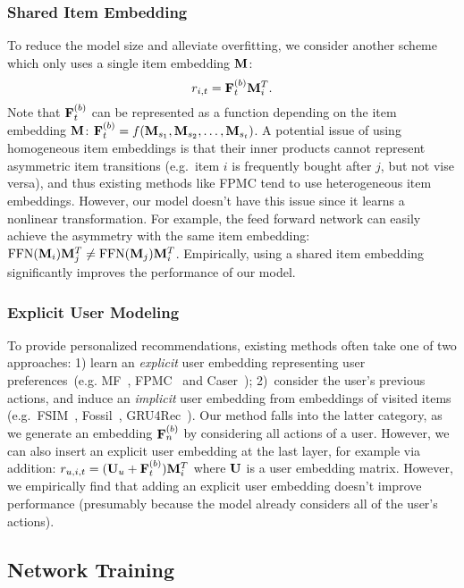 \documentclass[conference]{IEEEtran}
\def\F{{\bf F}}
\def\M{{\bf M}}
\def\U{{\bf U}}
\newcommand{\xhdr}[1]{\subsubsection*{\bf #1}}
\begin{document}
\xhdr{Shared Item Embedding} To reduce the model size and alleviate overfitting, we consider another scheme which only uses a single item embedding $\M$:
\begin{equation}
r_{i,t}=\F_t^{(b)}\M_i^T.
\end{equation}
Note that $\F_t^{(b)}$ can be represented as a function depending on 
the
item embedding $\M$: $\F_t^{(b)}=f(\M_{s_1},\M_{s_2},\dots,\M_{s_t})$. A potential issue of using homogeneous item embeddings is that their inner products cannot represent asymmetric item transitions (e.g.~item $i$ is frequently bought after $j$, but not vise versa), and thus existing methods like FPMC tend to use heterogeneous item embeddings. However, our model doesn't have this issue since it learns a nonlinear transformation. For example, the feed forward network can easily achieve the asymmetry with the same item embedding: $\text{FFN}(\M_i)\M_j^T\neq \text{FFN}(\M_j)\M_i^T$. Empirically, 
using a shared item embedding 
significantly improves the performance of our model.


\xhdr{Explicit User Modeling} To provide personalized recommendations, existing methods often take one of two approaches: 1) learn an \emph{explicit} user embedding representing user preferences~(e.g. MF~\cite{MF}, FPMC~\cite{rendle2010fpmc} and Caser~\cite{DBLP:conf/wsdm/TangW18}); 2)~consider the user's previous actions, 
and induce an \emph{implicit} user embedding from embeddings of visited items (e.g.~FSIM~\cite{kabbur2013fism}, Fossil~\cite{DBLP:conf/icdm/HeM16}, GRU4Rec~\cite{DBLP:journals/corr/HidasiKBT15}). Our method falls into the latter category, as we generate an embedding $\F^{(b)}_n$ by considering all actions of a user. However, we can also insert an explicit user embedding at the last layer, for example via addition: $r_{u,i,t}=(\U_u+\F_t^{(b)})\M_i^T$ where $\U$ is 
a
user embedding matrix. However, we empirically find 
that
adding 
an
explicit user embedding doesn't improve 
performance (presumably because the model already considers
all of
the user's
actions). 


\subsection{Network Training}
\end{document}
